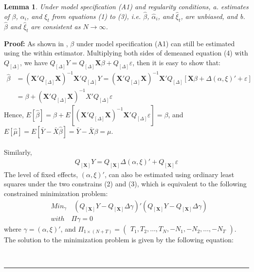 \documentclass[12pt]{article}
\newtheorem{lemma}{Lemma}
\newenvironment{proof}[1][Proof]{\noindent\textbf{#1:} }{\  \rule{0.5em}{0.5em}}
\begin{document}
\begin{lemma}
Under model specification (A1) and regularity conditions, a. estimates of $\beta$, $\alpha_{i}$, and $\xi_{t}$ from equations (1) to (3), i.e. $\hat{\beta}$, $\hat{\alpha}_{i}$, and $\hat{\xi}_{t}$, are unbiased, and b. $\hat{\beta}$ and $\hat{\xi}_{t}$ are consistent as $N \rightarrow \infty$.
\end{lemma}

\begin{proof}
\noindent  As shown in \citet{wansbeek1989estimation}, $\beta$ under model specification (A1) can still be estimated using the within estimator. Multiplying both sides of demeaned equation (4) with $Q_{[\Delta]}$, we have $Q_{[\Delta]} Y = Q_{[\Delta]} \mathbf{X} \beta + Q_{[\Delta]} \varepsilon$, then it is easy to show that:
\begin{align*}
\hat{\beta} & = (\mathbf{X}' Q_{[\Delta]} \mathbf{X})^{-1}\mathbf{X}' Q_{[\Delta]} Y = (\mathbf{X}' Q_{[\Delta]} \mathbf{X})^{-1}\mathbf{X}' Q_{[\Delta]} [\mathbf{X} \beta + \Delta (\alpha, \xi)' + \varepsilon] \\
 & = \beta + (\mathbf{X}' Q_{[\Delta]} \mathbf{X})^{-1}X' Q_{[\Delta]}  \varepsilon
\end{align*}   
   Hence, $E[\hat{\beta}] = \beta + E[(\mathbf{X}' Q_{[\Delta]} \mathbf{X})^{-1}\mathbf{X}' Q_{[\Delta]}  \varepsilon] = \beta$, and $E[\hat{\mu}] = E[\bar{Y} - \bar{X} \hat{\beta}] = \bar{Y} - \bar{X}\beta = \mu$. \\ \\
   Similarly, 
   \begin{align*}
   Q_{[\mathbf{X}]}Y = Q_{[\mathbf{X}]}\Delta (\alpha, \xi)' + Q_{[\mathbf{X}]} \varepsilon
   \end{align*}
  The level of fixed effects, $(\alpha, \xi)'$, can also be estimated using ordinary least squares under the two constrains (2) and (3), which is equivalent to the following constrained minimization problem:
\begin{align*}
& Min_{\gamma} \quad (Q_{[\mathbf{X}]}Y - Q_{[\mathbf{X}]}\Delta \gamma)'(Q_{[\mathbf{X}]}Y - Q_{[\mathbf{X}]}\Delta \gamma) \\
& with \quad \Pi \gamma = 0
\end{align*}
where $\gamma = (\alpha, \xi)'$, and $\Pi_{1 \times (N + T)} = \begin{pmatrix}
  T_1, T_2, \hdots, T_N, -N_1, -N_2, \hdots, -N_T 
\end{pmatrix}$. \\
The solution to the minimization problem is given by the following equation: 

\end{proof}
\end{document}
